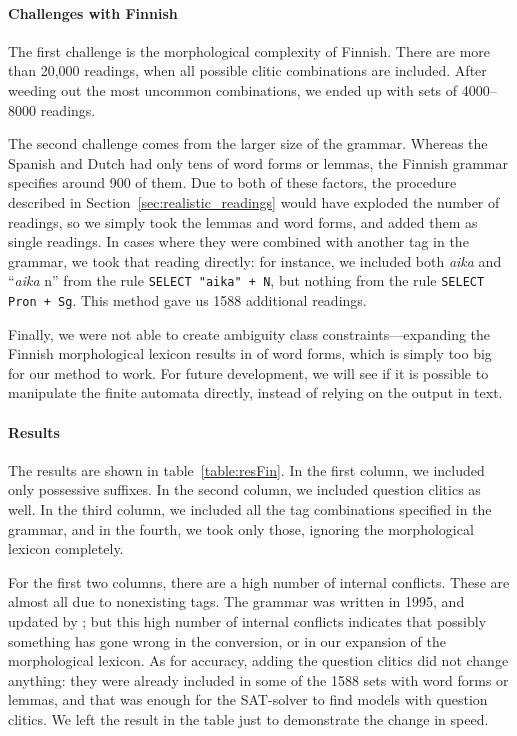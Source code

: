 \paragraph{Challenges with Finnish} The first challenge is the morphological complexity of Finnish.
There are more than 20,000 readings, when all possible clitic combinations are included.
After weeding out the most uncommon combinations, we ended up with sets of 4000--8000 readings.

The second challenge comes from the larger size of the grammar. Whereas the Spanish and Dutch had only tens of word forms or lemmas, the Finnish grammar specifies around 900 of them.
Due to both of these factors, the procedure described in Section~\ref{sec:realistic_readings} would have exploded the number of readings, so we simply took the lemmas and word forms, and added them as single readings. 
In cases where they were combined with another tag in the grammar, we took that reading directly: for instance, we included both \emph{aika} and ``\emph{aika} n'' from the rule \texttt{SELECT "aika" + N},
but nothing from the rule \texttt{SELECT Pron + Sg}. This method gave us 1588 additional readings.

Finally, we were not able to create ambiguity class constraints---expanding the Finnish morphological lexicon results in  of word forms, which is simply too big for our method to work. 
For future development, we will see if it is possible to manipulate the finite automata directly, instead of relying on the output in text.


\paragraph{Results}
The results are shown in table~\ref{table:resFin}.
In the first column, we included only possessive suffixes. In the second column, we included question clitics as well.
In the third column, we included all the tag combinations specified in the grammar, and in the fourth, we took only those, ignoring the morphological lexicon completely.

For the first two columns, there are a high number of internal conflicts. 
These are almost all due to nonexisting tags. The grammar was written in 1995, and updated by ; but this high number of internal conflicts indicates that possibly something has gone wrong in the conversion, or in our expansion of the morphological lexicon.
As for accuracy, adding the question clitics did not change anything: they were already included in some of the 1588 sets with word forms or lemmas, and that was enough for the SAT-solver to find models with question clitics.
We left the result in the table just to demonstrate the change in speed.

